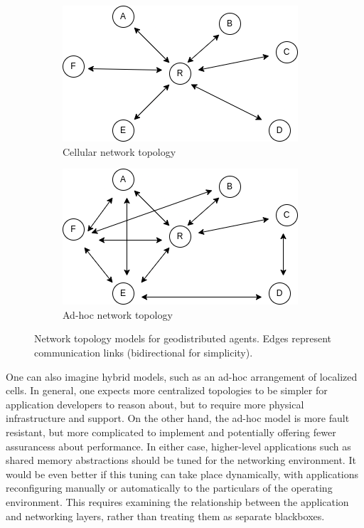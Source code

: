 \documentclass[]             %
{NASA}                       %
\theoremstyle{definition}
\begin{document}
\begin{figure}[h]
  \centering
  \begin{subfigure}[b]{0.48\textwidth}
    \centering
    \includegraphics[width=\textwidth]{images/Centralized.png}
    \caption{Cellular network topology}
    \label{fig:centralized}
  \end{subfigure}
  \hfill
  \begin{subfigure}[b]{0.48\textwidth}
    \centering
    \includegraphics[width=\textwidth]{images/Decentralized.png}
    \caption{Ad-hoc network topology}
    \label{fig:decentralized}
  \end{subfigure}
  \caption{Network topology models for geodistributed agents. Edges represent communication links (bidirectional for simplicity).}
  \label{fig:nettopology}
\end{figure}

One can also imagine hybrid models, such as an ad-hoc arrangement of
localized cells. In general, one expects more centralized topologies to
be simpler for application developers to reason about, but to require
more physical infrastructure and support. On the other hand, the ad-hoc
model is more fault resistant, but more complicated to implement and
potentially offering fewer assurancess about performance. In either
case, higher-level applications such as shared memory abstractions
should be tuned for the networking environment. It would be even better
if this tuning can take place dynamically, with applications
reconfiguring manually or automatically to the particulars of the
operating environment. This requires examining the relationship between
the application and networking layers, rather than treating them as
separate blackboxes.
\end{document}
